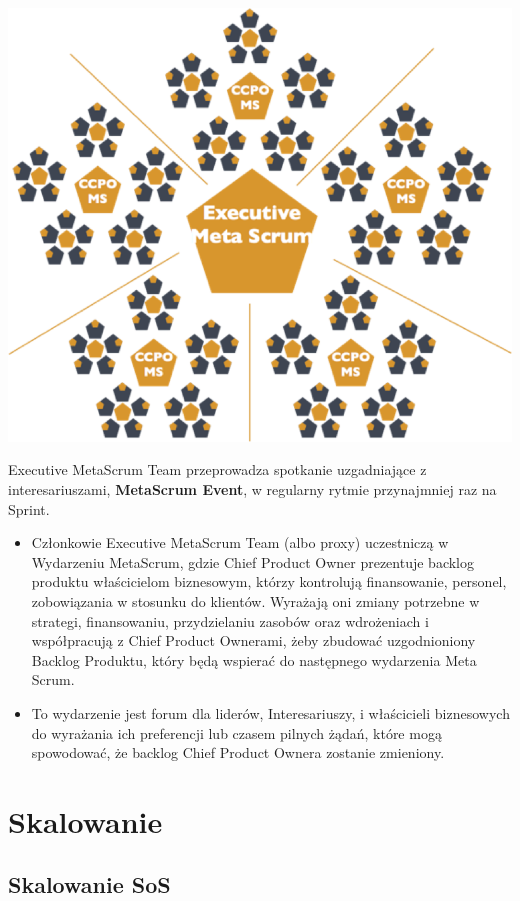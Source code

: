 \documentclass[12pt,a4paper,parskip=full]{scrartcl}
\begin{document}
\includegraphics[width=1.0\linewidth]{ExecMetaScrum.png}

Executive MetaScrum Team przeprowadza spotkanie uzgadniające z interesariuszami, \textbf{MetaScrum Event}, w regularny rytmie przynajmniej raz na Sprint.

\begin{itemize}
	\item Członkowie Executive MetaScrum Team (albo proxy) uczestniczą w Wydarzeniu MetaScrum, gdzie Chief Product Owner prezentuje backlog produktu właścicielom biznesowym, którzy kontrolują finansowanie, personel, zobowiązania w stosunku do klientów. Wyrażają oni zmiany potrzebne w strategi, finansowaniu, przydzielaniu zasobów oraz wdrożeniach i współpracują z Chief Product Ownerami, żeby zbudować uzgodnioniony Backlog Produktu, który będą wspierać do następnego wydarzenia Meta Scrum.
	\item To wydarzenie jest forum dla  liderów, Interesariuszy, i właścicieli biznesowych do wyrażania ich preferencji lub czasem pilnych żądań, które mogą spowodować, że backlog Chief Product Ownera zostanie zmieniony.
\end{itemize}

\section{Skalowanie}

\subsection{Skalowanie SoS}
\end{document}
